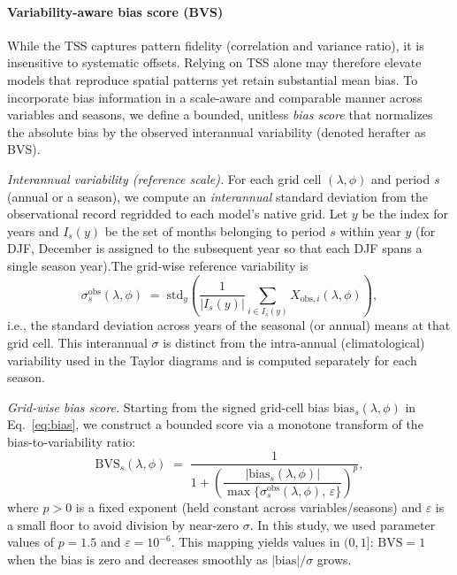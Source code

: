\documentclass[pdflatex,sn-chicago]{sn-jnl}%
\theoremstyle{thmstyleone}%
\theoremstyle{thmstyletwo}%
\theoremstyle{thmstylethree}%
\begin{document}
\paragraph{\textbf{Variability-aware bias score (BVS)}}
While the TSS captures pattern fidelity (correlation and variance ratio), it is insensitive to systematic offsets. Relying on TSS alone may therefore elevate models that reproduce spatial patterns yet retain substantial mean bias. To incorporate bias information in a scale-aware and comparable manner across variables and seasons, we define a bounded, unitless \emph{bias score} that normalizes the absolute bias by the observed interannual variability (denoted herafter as BVS).

\medskip
\noindent\textit{Interannual variability (reference scale).} For each grid cell \((\lambda,\phi)\) and period \(s\) (annual or a season), we compute an \emph{interannual} standard deviation from the observational record regridded to each model’s native grid. Let \(y\) be the index for years and \(I_s(y)\) be the set of months belonging to period \(s\) within year \(y\) (for DJF, December is assigned to the subsequent year so that each DJF spans a single season year).The grid-wise reference variability is
\[
\sigma_{s}^{\text{obs}}(\lambda,\phi)
\;=\;
\mathrm{std}_{y}\!\left(
\frac{1}{|I_s(y)|}\sum_{i\in I_s(y)} X_{\text{obs},i}(\lambda,\phi)
\right),
\]
i.e., the standard deviation across years of the seasonal (or annual) means at that grid cell. This interannual \(\sigma\) is distinct from the intra-annual (climatological) variability used in the Taylor diagrams and is computed separately for each season.

\medskip
\noindent\textit{Grid-wise bias score.} Starting from the signed grid-cell bias \(\text{bias}_s(\lambda,\phi)\) in Eq.~\eqref{eq:bias}, we construct a bounded score via a monotone transform of the bias-to-variability ratio:
\begin{equation}
\label{eq:bias_score_grid}
\text{BVS}_s(\lambda,\phi)
\;=\;
\frac{1}{1 + \left(\dfrac{|\text{bias}_s(\lambda,\phi)|}
{\max\{\sigma_{s}^{\text{obs}}(\lambda,\phi),\,\varepsilon\}}\right)^{p}},
\end{equation}
where \(p>0\) is a fixed exponent (held constant across variables/seasons) and \(\varepsilon\) is a small floor to avoid division by near-zero \(\sigma\). In this study, we used parameter values of $p=1.5$ and $\varepsilon=10^{-6}$. This mapping yields values in \((0,1]\): \(\text{BVS}=1\) when the bias is zero and decreases smoothly as \(|\text{bias}|/\sigma\) grows.
\end{document}
